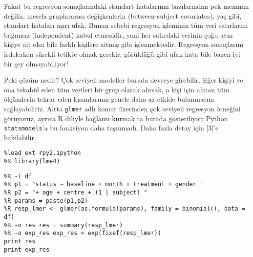 \documentclass[12pt,fleqn]{article}\usepackage{../../common}
\begin{document}
Fakat bu regresyon sonuçlarındaki standart hatalarının bazılarından pek
memnun değiliz, mesela gruplararası değişkenlerin (between-subject
covariates), yaş gibi, standart hataları aşırı ufak. Bunun sebebi regresyon
işleminin tüm veri satırlarını bağımsız (independent) kabul etmesidir, yani
her satırdaki verinin çoğu aynı kişiye ait olsa bile farklı kişilere aitmiş
gibi işlenmektedir. Regresyon sonuçlarını irdelerken sürekli tetikte olmak
gerekir, görüldüğü gibi ufak hata bile bazen iyi bir şey olmayabiliyor!

Peki çözüm nedir? Çok seviyeli modeller burada devreye girebilir. Eğer
kişiyi ve ona tekabül eden tüm verileri bir grup olarak alırsak, o kişi
için alınan tüm ölçümlerin tekrar eden kısımlarının genele daha az etkide
bulunmasını sağlayabiliriz. Altta \verb!glmer! adlı komut üzerinden çok
seviyeli regresyon örneğini görüyoruz, ayrıca R diliyle bağlantı kurmak ta
burada gösteriliyor; Python \verb!statsmodels!'a bu fonksiyon daha
taşınmadı. Daha fazla detay için [3]'e bakılabilir.

\begin{verbatim}
%load_ext rpy2.ipython
%R library(lme4)
\end{verbatim}

\begin{verbatim}
%R -i df 
%R p1 = "status ~ baseline + month + treatment + gender "
%R p2 = "+ age + centre + (1 | subject) "
%R params = paste(p1,p2)
%R resp_lmer <- glmer(as.formula(params), family = binomial(), data = df)
%R -o res res = summary(resp_lmer)
%R -o exp_res exp_res = exp(fixef(resp_lmer))
print res
print exp_res
\end{verbatim}
\end{document}
